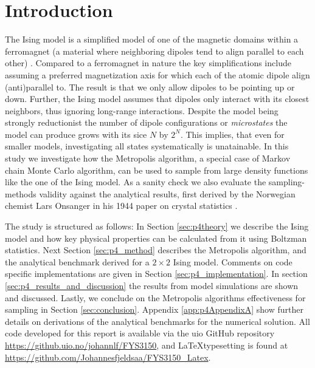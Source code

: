 \documentclass[../main_proj4_correct_template.tex]{subfiles}
\begin{document}
\section{Introduction}\label{Introduction}


The Ising model is a simplified model of one of the magnetic domains within a ferromagnet (a material where neighboring dipoles tend to align parallel to each other) \cite{thermal_physics}. Compared to a ferromagnet in nature the key simplifications include assuming a preferred magnetization axis for which each of the atomic dipole align (anti)parallel to. The result is that we only allow dipoles to be pointing up or down. Further, the Ising model assumes that dipoles only interact with its closest neighbors, thus ignoring long-range interactions. Despite the model being strongly reductionist the number of dipole configurations or \textit{microstates} the model can produce grows with its sice $N$ by $2^{N}$. This implies, that even for smaller models, investigating all states systematically is unatainable. In this study we investigate how the Metropolis algorithm, a special case of Markov chain Monte Carlo algorithm, can be used to sample from large density functions like the one of the Ising model. As a sanity check we also evaluate the sampling-methods validity against the analytical results, first derived by the Norwegian chemist Lars Onsanger in his 1944 paper on crystal statistics \cite{onsanger_crystal_stat}. 

The study is structured as follows: In Section \ref{sec:p4theory} we describe the Ising model and how key physical properties can be calculated from it using Boltzman statistics. Next Section \ref{sec:p4_method} describes the Metropolis algorithm, and the analytical benchmark derived for a $2\times 2$ Ising model. Comments on code specific implementations are given in Section \ref{sec:p4_implementation}. In section \ref{sec:p4_results_and_discussion} the results from model simulations are shown and discussed. Lastly, we conclude on the Metropolis algorithms effectiveness for sampling in Section \ref{sec:conclusion}. Appendix \ref{app:p4AppendixA} show further details on derivations of the analytical benchmarks for the numerical solution. All code developed for this report is available via the uio GitHub repository \href{https://github.uio.no/johannlf/FYS3150}{https://github.uio.no/johannlf/FYS3150}, and \LaTeX typesetting is found at \href{https://github.com/Johannesfjeldsaa/FYS3150_Latex}{https://github.com/Johannesfjeldsaa/FYS3150_Latex}.
\end{document}
